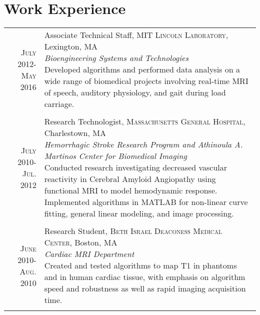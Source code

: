 \documentclass[letterpaper,11pt]{article}
\begin{document}
\section{Work Experience}
\begin{tabular}{r|p{14.5cm}}
%
%
\parbox[t][][t]{3.5cm}{\raggedleft \textsc{July 2012- May 2016}} & \parbox[t][][t]{13.5cm}{\raggedright Associate Technical Staff, \textsc{MIT Lincoln Laboratory}, Lexington, MA\\ \emph{Bioengineering Systems and Technologies}\\\footnotesize{Developed algorithms and performed data analysis on a wide range of biomedical projects involving real-time MRI of speech, auditory physiology, and gait during load carriage.}}\\ \vspace{-0.2cm}\\
%
\parbox[t][][t]{3.5cm}{\raggedleft \textsc{July 2010- Jul. 2012}} & \parbox[t][][t]{13.5cm}{\raggedright Research Technologist, \textsc{Massachusetts General Hospital}, Charlestown, MA \\\emph{Hemorrhagic Stroke Research Program and Athinoula A. Martinos Center for Biomedical Imaging}\\\footnotesize{Conducted research investigating decreased vascular reactivity in Cerebral Amyloid Angiopathy using functional MRI to model hemodynamic response. Implemented algorithms in MATLAB for non-linear curve fitting, general linear modeling, and image processing.}}\\ \vspace{-0.2cm}\\
%
%
\parbox[t][][t]{3.5cm}{\raggedleft \textsc{June 2010-Aug. 2010}} & \parbox[t][][t]{13.5cm}{Research Student, \textsc{Beth Israel Deaconess Medical Center}, Boston, MA \\\emph{Cardiac MRI Department}\\\footnotesize{Created and tested algorithms to map T1 in phantoms and in human cardiac tissue, with emphasis on algorithm speed and robustness as well as rapid imaging acquisition time.}}\\ \vspace{-0.2cm} \\
\end{tabular}
\end{document}
